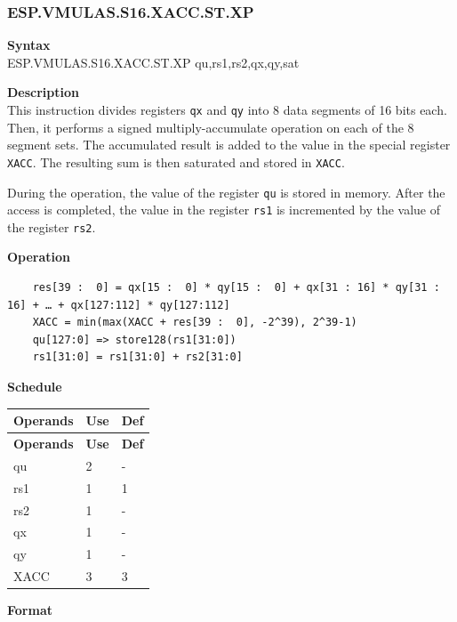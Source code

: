 \newpage
\subsubsection{ESP.VMULAS.S16.XACC.ST.XP}\label{instruction:ESPVMULASS16XACCSTXP}
\textbf{Syntax}\\
ESP.VMULAS.S16.XACC.ST.XP qu,rs1,rs2,qx,qy,sat

\textbf{Description}\\
This instruction divides registers \lstinline{qx} and \lstinline{qy} into 8 data segments of 16 bits each. Then, it performs a signed multiply-accumulate operation on each of the 8 segment sets. The accumulated result is added to the value in the special register \lstinline{XACC}. The resulting sum is then saturated and stored in \lstinline{XACC}.

During the operation, the value of the register \lstinline{qu} is stored in memory. After the access is completed, the value in the register \lstinline{rs1} is incremented by the value of the register \lstinline{rs2}.

\textbf{Operation}\\
\begin{lstlisting}
    res[39 :  0] = qx[15 :  0] * qy[15 :  0] + qx[31 : 16] * qy[31 : 16] + … + qx[127:112] * qy[127:112]
    XACC = min(max(XACC + res[39 :  0], -2^39), 2^39-1)
    qu[127:0] => store128(rs1[31:0])
    rs1[31:0] = rs1[31:0] + rs2[31:0]
\end{lstlisting}

\textbf{Schedule}\\
\begin{longtable}[c]{|l|l|l|}
    \hline
    \rowcolor{lightgray}
    \textbf{Operands} & \textbf{Use} & \textbf{Def} \\\hline
    \endfirsthead
    \hline
    \rowcolor{lightgray}
     \textbf{Operands} & \textbf{Use} & \textbf{Def} \\\hline
    \endhead
    \hline
    \endfoot

    qu & 2 & - \\\hline
    rs1 & 1 & 1 \\\hline
    rs2 & 1 & - \\\hline
     qx & 1 & - \\\hline
     qy & 1 & - \\\hline
     XACC & 3 & 3

\end{longtable}

\textbf{Format}\\

